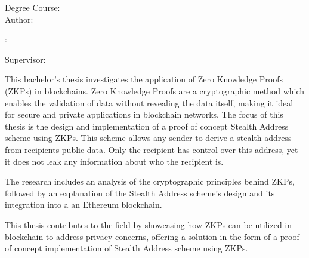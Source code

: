 \begin{minipage}[t]{1\columnwidth}
    \FIITuniversity

    \FIITfaculty

    Degree Course: \FIITstudyProgram\\

    Author: \FIITauthor

    \FIITthesis: \FIITtitle

    Supervisor: \FIITsupervisor

    \FIITdate
\end{minipage}

\bigskip{}

This bachelor's thesis investigates the application of Zero Knowledge Proofs
(ZKPs) in blockchains. Zero Knowledge Proofs are a cryptographic
method which enables the validation of data without revealing the
data itself, making it ideal for secure and private applications in
blockchain networks. The focus of this thesis is the design and implementation
of a proof of concept Stealth Address scheme using ZKPs. This scheme allows any sender to
derive a stealth address from recipients public data. Only the recipient has
control over this address, yet it does not leak any information about who the
recipient is.

The research includes an analysis of the cryptographic principles behind
ZKPs, followed by an explanation of the Stealth Address scheme's design and
its integration into a an Ethereum blockchain.

This thesis contributes to the field by showcasing how ZKPs can be utilized
in blockchain to address privacy concerns, offering a solution in the form of
a proof of concept  implementation of Stealth Address scheme using ZKPs.

\newpage{}\thispagestyle{empty}

\emptypage
